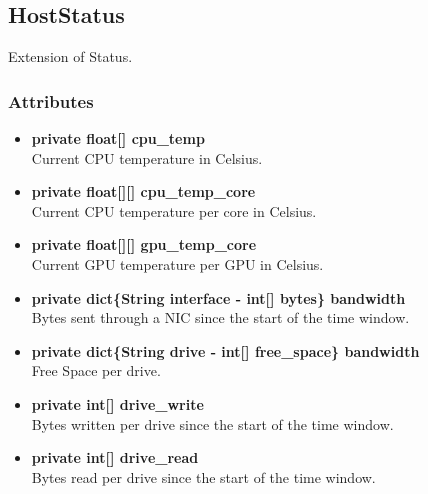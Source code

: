 \subsection{HostStatus}
Extension of Status.

\subsubsection{Attributes}
\begin{itemize}
	\item \textbf{private float[] cpu\_temp}\\
	Current CPU temperature in Celsius.
	\item \textbf{private float[][] cpu\_temp\_core}\\
	Current CPU temperature per core in Celsius.
	\item \textbf{private float[][] gpu\_temp\_core}\\
	Current GPU temperature per GPU in Celsius.
	\item \textbf{private dict\{String interface - int[] bytes\} bandwidth }\\
	Bytes sent through a NIC since the start of the time window.
	\item \textbf{private dict\{String drive - int[] free\_space\} bandwidth}\\
	Free Space per drive.
	\item \textbf{private int[] drive\_write}\\
	Bytes written per drive since the start of the time window.
	\item \textbf{private int[] drive\_read}\\
	Bytes read per drive since the start of the time window.
\end{itemize}

